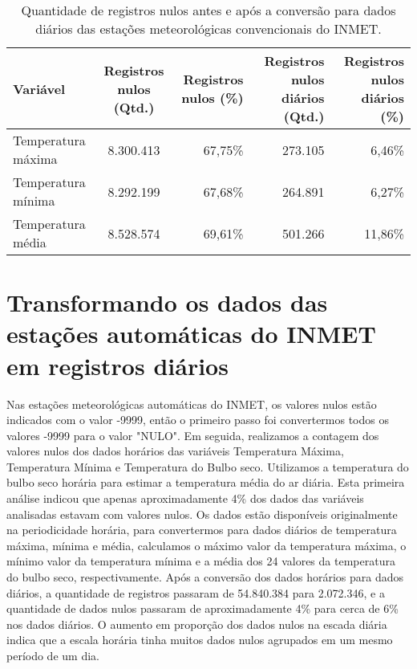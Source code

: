 \begin{table}[H]
\caption{Quantidade de registros nulos antes e após a conversão para dados diários das estações meteorológicas convencionais do INMET.}
\label{tab:estacoes_convencionais_inmet_dados_nulos}
\begin{adjustbox}{width=\textwidth}
\begin{tabular}{|l|c|r|r|r|}
\hline
\textbf{Variável} & \textbf{Registros nulos (Qtd.)} & \textbf{Registros nulos (\%)} & \textbf{Registros nulos diários (Qtd.)} & \textbf{Registros nulos diários (\%)} \\
\hline
Temperatura máxima  & 8.300.413 & 67,75\% & 273.105 & 6,46\% \\
\hline
Temperatura mínima & 8.292.199 & 67,68\% & 264.891 & 6,27\% \\
\hline
Temperatura média & 8.528.574 & 69,61\% & 501.266 & 11,86\% \\
\hline
\end{tabular}
\end{adjustbox}
\end{table}

\section{Transformando os dados das estações automáticas do INMET em registros diários}

Nas estações meteorológicas automáticas do INMET, os valores nulos estão indicados com o valor -9999, então o primeiro passo foi convertermos todos os valores -9999 para o valor "NULO". Em seguida, realizamos a contagem dos valores nulos dos dados horários das variáveis Temperatura Máxima, Temperatura Mínima e Temperatura do Bulbo seco. Utilizamos a temperatura do bulbo seco horária para estimar a temperatura média do ar diária. Esta primeira análise indicou que apenas aproximadamente 4\% dos dados das variáveis analisadas estavam com valores nulos. Os dados estão disponíveis originalmente na periodicidade horária, para convertermos para dados diários de temperatura máxima, mínima e média, calculamos o máximo valor da temperatura máxima, o mínimo valor da temperatura mínima e a média dos 24 valores da temperatura do bulbo seco, respectivamente. Após a conversão dos dados horários para dados diários, a quantidade de registros passaram de 54.840.384 para 2.072.346, e a quantidade de dados nulos passaram de aproximadamente 4\% para cerca de 6\% nos dados diários. O aumento em proporção dos dados nulos na escada diária indica que a escala horária tinha muitos dados nulos agrupados em um mesmo período de um dia. 


